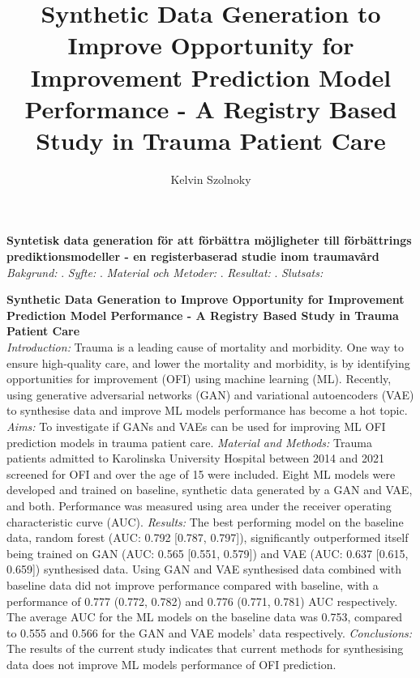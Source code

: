 \documentclass[12pt, a4paper]{article}
\author{Kelvin Szolnoky}
\title{Synthetic Data Generation to Improve Opportunity for Improvement Prediction Model Performance - A Registry Based Study in Trauma Patient Care}
\begin{document}

\begin{titlepage}
    
\end{titlepage}
\fontsize{11}{13}\selectfont


\textbf{Syntetisk data generation för att förbättra möjligheter till förbättrings prediktionsmodeller - en registerbaserad studie inom traumavård} \\
\textit{Bakgrund:} . \textit{Syfte:} . \textit{Material och Metoder:} . \textit{Resultat:} . \textit{Slutsats:}
\vfill

\textbf{Synthetic Data Generation to Improve Opportunity for Improvement Prediction Model Performance - A Registry Based Study in Trauma Patient Care} \\
\textit{Introduction:} Trauma is a leading cause of mortality and morbidity. One way to ensure high-quality care, and lower the mortality and morbidity, is by identifying opportunities for improvement (OFI) using machine learning (ML). Recently, using generative adversarial networks (GAN) and variational autoencoders (VAE) to synthesise data and improve ML models performance has become a hot topic. \textit{Aims:} To investigate if GANs and VAEs can be used for improving ML OFI prediction models in trauma patient care. \textit{Material and Methods:} Trauma patients admitted to Karolinska University Hospital between 2014 and 2021 screened for OFI and over the age of 15 were included. Eight ML models were developed and trained on baseline, synthetic data generated by a GAN and VAE, and both. Performance was measured using area under the receiver operating characteristic curve (AUC). \textit{Results:} The best performing model on the baseline data, random forest (AUC: 0.792 [0.787, 0.797]), significantly outperformed itself being trained on GAN (AUC: 0.565 [0.551, 0.579]) and VAE (AUC: 0.637 [0.615, 0.659]) synthesised data. Using GAN and VAE synthesised data combined with baseline data did not improve performance compared with baseline, with a performance of 0.777 (0.772, 0.782) and 0.776 (0.771, 0.781) AUC respectively. The average AUC for the ML models on the baseline data was 0.753, compared to 0.555 and 0.566 for the GAN and VAE models' data respectively. \textit{Conclusions:} The results of the current study indicates that current methods for synthesising data does not improve ML models performance of OFI prediction.
\vfill
\end{document}

